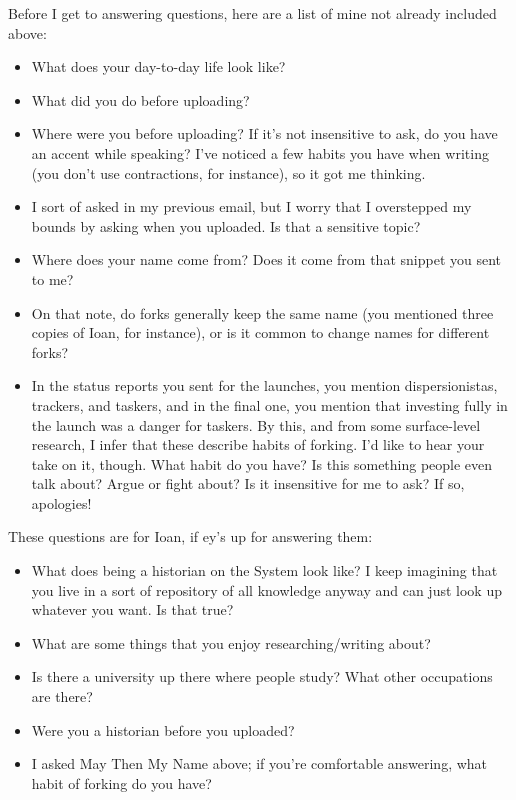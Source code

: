 Before I get to answering questions, here are a list of mine not already included above:

\begin{itemize}
\tightlist
\item
  What does your day-to-day life look like?
\item
  What did you do before uploading?
\item
  Where were you before uploading? If it's not insensitive to ask, do you have an accent while speaking? I've noticed a few habits you have when writing (you don't use contractions, for instance), so it got me thinking.
\item
  I sort of asked in my previous email, but I worry that I overstepped my bounds by asking when you uploaded. Is that a sensitive topic?
\item
  Where does your name come from? Does it come from that snippet you sent to me?
\item
  On that note, do forks generally keep the same name (you mentioned three copies of Ioan, for instance), or is it common to change names for different forks?
\item
  In the status reports you sent for the launches, you mention dispersionistas, trackers, and taskers, and in the final one, you mention that investing fully in the launch was a danger for taskers. By this, and from some surface-level research, I infer that these describe habits of forking. I'd like to hear your take on it, though. What habit do you have? Is this something people even talk about? Argue or fight about? Is it insensitive for me to ask? If so, apologies!
\end{itemize}

These questions are for Ioan, if ey's up for answering them:

\begin{itemize}
\tightlist
\item
  What does being a historian on the System look like? I keep imagining that you live in a sort of repository of all knowledge anyway and can just look up whatever you want. Is that true?
\item
  What are some things that you enjoy researching/writing about?
\item
  Is there a university up there where people study? What other occupations are there?
\item
  Were you a historian before you uploaded?
\item
  I asked May Then My Name above; if you're comfortable answering, what habit of forking do you have?
\end{itemize}

